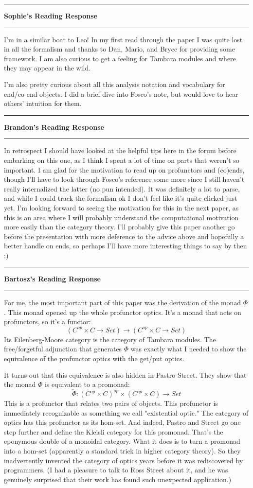 \documentclass{amsart}
\newcommand{\iam}[1]{
  \vspace{0.25em}
  \hrule
  \vspace{0.25em}
  \textbf{{#1}'s Reading Response}
  \vspace{0.25em}
  \hrule
  \vspace{1em}
}
\begin{document}
\iam{Sophie}

I'm in a similar boat to Leo! In my first read through the paper I was quite lost in all the formalism and thanks to Dan, Mario, and Bryce for providing some framework. I am also curious to get a feeling for Tambara modules and where they may appear in the wild.

I'm also pretty curious about all this analysis notation and vocabulary for end/co-end objects. I did a brief dive into Fosco's note, but would love to hear others' intuition for them.


\iam{Brandon}

In retrospect I should have looked at the helpful tips here in the forum before embarking on this one, as I think I spent a lot of time on parts that weren't so important.  I am glad for the motivation to read up on profunctors and (co)ends, though I'll have to look through Fosco's reference some more since I still haven't really internalized the latter (no pun intended).  It was definitely a lot to parse, and while I could track the formalism ok I don't feel like it's quite clicked just yet. I'm looking forward to seeing the motivation for this in the next paper, as this is an area where I will probably understand the computational motivation more easily than the category theory.  I'll probably give this paper another go before the presentation with more deference to the advice above and hopefully a better handle on ends, so perhaps I'll have more interesting things to say by then :)

\iam{Bartosz}

For me, the most important part of this paper was the derivation of the monad $\Phi$. This monad opened up the whole profunctor optics. It's a monad that acts on profunctors, so it's a functor:
\[(C^{op}\times C \to Set) \to (C^{op}\times C \to Set)\]
Its Eilenberg-Moore category is the category of Tambara modules. The free/forgetful adjunction that generates $\Phi$ was exactly what I needed to show the equivalence of the profunctor optics with the get/put optics. 

It turns out that this equivalence is also hidden in Pastro-Street. They show that the monad $\Phi$ is equivalent to a promonad:
\[\check{\Phi} : (C^{op}\times C)^{op} \times (C^{op}\times C) \to Set\]
This is a profunctor that relates two pairs of objects. This profunctor is immediately recognizable as something we call "existential optic." The category of optics has this profunctor as its hom-set. And indeed, Pastro and Street go one step further and define the Kleisli category for this promonad. That's the eponymous double of a monoidal category. What it does is to turn a promonad into a hom-set (apparently a standard trick in higher category theory). So they inadvertently invented the category of optics years before it was rediscovered by programmers. (I had a pleasure to talk to Ross Street about it, and he was genuinely surprised that their work has found such unexpected application.)
\end{document}

